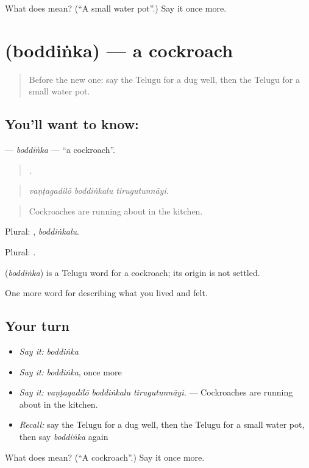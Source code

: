 \begin{tcolorbox}[breakable,colback=teal!4,colframe=teal!35!black,title={Before you move on}]
What does  mean? (\textquotedblleft{}A small water pot\textquotedblright{}.) Say it once more.
\end{tcolorbox}
\section[\texorpdfstring{\te{బొద్దింక} (boddiṅka)}{బొద్దింక (boddiṅka)}]{ (boddiṅka) — a cockroach}

\label{lesson:TE-C546-boddinka}



\begin{quote}
Before the new one: say the Telugu for a dug well, then the Telugu for a small water pot.
\end{quote}

\subsection*{You'll want to know: }
\textbf{} — \emph{boddiṅka} — \textquotedblleft{}a cockroach\textquotedblright{}.

\begin{quote}
  .
\end{quote}

\begin{quote}
\emph{vaṇṭagadilō boddiṅkalu tirugutunnāyi.}
\end{quote}

\begin{quote}
Cockroaches are running about in the kitchen.
\end{quote}

Plural: , \emph{boddiṅkalu}.

Plural: .

\begin{cousinweb}
\textbf{} (\emph{boddiṅka}) is a Telugu word for a cockroach; its origin is not settled.
\end{cousinweb}

\begin{grammarlens}[title={What you've built}]
One more word for describing what you lived and felt.
\end{grammarlens}

\subsection*{Your turn}
\begin{itemize}
\raggedright
  \item \emph{Say it:} \emph{boddiṅka}
  \item \emph{Say it:} \emph{boddiṅka}, once more
  \item \emph{Say it:} \emph{vaṇṭagadilō boddiṅkalu tirugutunnāyi.} — Cockroaches are running about in the kitchen.
  \item \emph{Recall:} say the Telugu for a dug well, then the Telugu for a small water pot, then say \emph{boddiṅka} again
\end{itemize}

\begin{tcolorbox}[breakable,colback=teal!4,colframe=teal!35!black,title={Before you move on}]
What does  mean? (\textquotedblleft{}A cockroach\textquotedblright{}.) Say it once more.
\end{tcolorbox}
